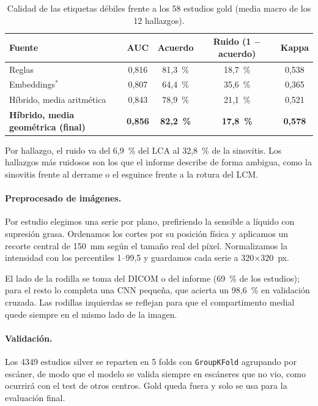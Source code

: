 \documentclass{article}
\begin{document}
\begin{table}[t]
  \centering
  \caption{Calidad de las etiquetas débiles frente a los 58 estudios gold (media macro de los 12 hallazgos).}
  \label{tab:etiquetas}
  \begin{tabular}{lcccc}
    \toprule
    Fuente & AUC & Acuerdo & Ruido (1 $-$ acuerdo) & Kappa \\
    \midrule
    Reglas & 0,816 & 81,3~\% & 18,7~\% & 0,538 \\
    Embeddings$^{*}$ & 0,807 & 64,4~\% & 35,6~\% & 0,365 \\
    Híbrido, media aritmética & 0,843 & 78,9~\% & 21,1~\% & 0,521 \\
    \textbf{Híbrido, media geométrica (final)} & \textbf{0,856} & \textbf{82,2~\%} & \textbf{17,8~\%} & \textbf{0,578} \\
    \bottomrule
  \end{tabular}
\end{table}

Por hallazgo, el ruido va del 6,9~\% del LCA al 32,8~\% de la sinovitis. Los hallazgos más ruidosos son los que el informe describe de forma ambigua, como la sinovitis frente al derrame o el esguince frente a la rotura del LCM.

\paragraph{Preprocesado de imágenes.} Por estudio elegimos una serie por plano, prefiriendo la sensible a líquido con supresión grasa. Ordenamos los cortes por su posición física y aplicamos un recorte central de 150~mm según el tamaño real del píxel. Normalizamos la intensidad con los percentiles 1--99,5 y guardamos cada serie a 320×320~px.

El lado de la rodilla se toma del DICOM o del informe (69~\% de los estudios); para el resto lo completa una CNN pequeña, que acierta un 98,6~\% en validación cruzada. Las rodillas izquierdas se reflejan para que el compartimento medial quede siempre en el mismo lado de la imagen.

\paragraph{Validación.} Los 4349 estudios silver se reparten en 5 folds con \texttt{GroupKFold} agrupando por escáner, de modo que el modelo se valida siempre en escáneres que no vio, como ocurrirá con el test de otros centros. Gold queda fuera y solo se usa para la evaluación final.
\end{document}
